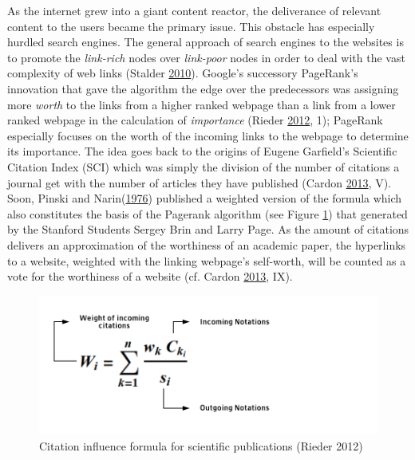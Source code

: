 \documentclass[12pt,twoside]{report}
\begin{document}
As the internet grew into a giant content reactor, the deliverance of relevant content to the users became the primary issue. This obstacle has especially hurdled search engines. The general approach of search engines to the websites is to promote the \emph{link-rich} nodes over \emph{link-poor} nodes in order to deal with the vast complexity of web links (Stalder \protect\hyperlink{ref-Stalder2009}{2010}). Google's successory PageRank's innovation that gave the algorithm the edge over the predecessors was assigning more \emph{worth} to the links from a higher ranked webpage than a link from a lower ranked webpage in the calculation of \emph{importance} (Rieder \protect\hyperlink{ref-Rieder2012}{2012}, 1); PageRank especially focuses on the worth of the incoming links to the webpage to determine its importance. The idea goes back to the origins of Eugene Garfield's Scientific Citation Index (SCI) which was simply the division of the number of citations a journal get with the number of articles they have published (Cardon \protect\hyperlink{ref-Cardon2013}{2013}, V). Soon, Pinski and Narin(\protect\hyperlink{ref-Pinski1976}{1976}) published a weighted version of the formula which also constitutes the basis of the Pagerank algorithm (see Figure \ref{fig:Narin}) that generated by the Stanford Students Sergey Brin and Larry Page. As the amount of citations delivers an approximation of the worthiness of an academic paper, the hyperlinks to a website, weighted with the linking webpage's self-worth, will be counted as a vote for the worthiness of a website (cf. Cardon \protect\hyperlink{ref-Cardon2013}{2013}, IX).

\begin{figure}

{\centering \includegraphics{Narin} 

}

\caption{Citation influence formula for scientific publications (Rieder 2012)}\label{fig:Narin}
\end{figure}
\end{document}
